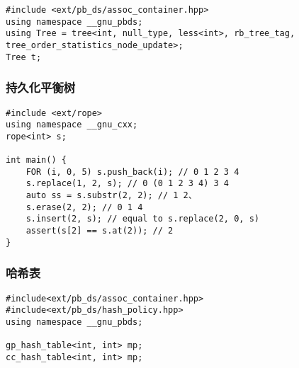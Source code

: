 \documentclass[]{article}
\begin{document}
\begin{verbatim}
#include <ext/pb_ds/assoc_container.hpp>
using namespace __gnu_pbds;
using Tree = tree<int, null_type, less<int>, rb_tree_tag, tree_order_statistics_node_update>;
Tree t;
\end{verbatim}

\hypertarget{ux6301ux4e45ux5316ux5e73ux8861ux6811}{%
\subsubsection{持久化平衡树}\label{ux6301ux4e45ux5316ux5e73ux8861ux6811}}

\begin{verbatim}
#include <ext/rope>
using namespace __gnu_cxx;
rope<int> s;

int main() {
    FOR (i, 0, 5) s.push_back(i); // 0 1 2 3 4
    s.replace(1, 2, s); // 0 (0 1 2 3 4) 3 4
    auto ss = s.substr(2, 2); // 1 2、
    s.erase(2, 2); // 0 1 4
    s.insert(2, s); // equal to s.replace(2, 0, s)
    assert(s[2] == s.at(2)); // 2
}
\end{verbatim}

\hypertarget{ux54c8ux5e0cux8868}{%
\subsubsection{哈希表}\label{ux54c8ux5e0cux8868}}

\begin{verbatim}
#include<ext/pb_ds/assoc_container.hpp>
#include<ext/pb_ds/hash_policy.hpp>
using namespace __gnu_pbds;

gp_hash_table<int, int> mp;
cc_hash_table<int, int> mp;
\end{verbatim}

\hypertarget{section-1}{%
\subsection{}\label{section-1}}
\end{document}
